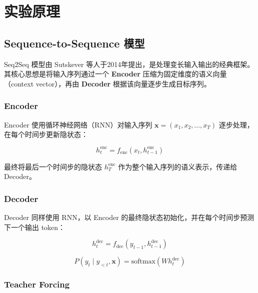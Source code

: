 \documentclass[12pt, a4paper]{article}
\begin{document}
\section{实验原理}

\subsection{Sequence-to-Sequence 模型}

Seq2Seq 模型由 Sutskever 等人于2014年提出，是处理变长输入输出的经典框架。其核心思想是将输入序列通过一个 \textbf{Encoder} 压缩为固定维度的语义向量（context vector），再由 \textbf{Decoder} 根据该向量逐步生成目标序列。

\subsubsection{Encoder}

Encoder 使用循环神经网络（RNN）对输入序列 $\mathbf{x} = (x_1, x_2, \ldots, x_T)$ 逐步处理，在每个时间步更新隐状态：

\begin{equation}
    h_t^{\text{enc}} = f_{\text{enc}}(x_t, h_{t-1}^{\text{enc}})
\end{equation}

最终将最后一个时间步的隐状态 $h_T^{\text{enc}}$ 作为整个输入序列的语义表示，传递给 Decoder。

\subsubsection{Decoder}

Decoder 同样使用 RNN，以 Encoder 的最终隐状态初始化，并在每个时间步预测下一个输出 token：

\begin{equation}
    h_t^{\text{dec}} = f_{\text{dec}}(y_{t-1}, h_{t-1}^{\text{dec}})
\end{equation}

\begin{equation}
    P(y_t \mid y_{<t}, \mathbf{x}) = \text{softmax}(W h_t^{\text{dec}})
\end{equation}

\subsubsection{Teacher Forcing}
\end{document}
